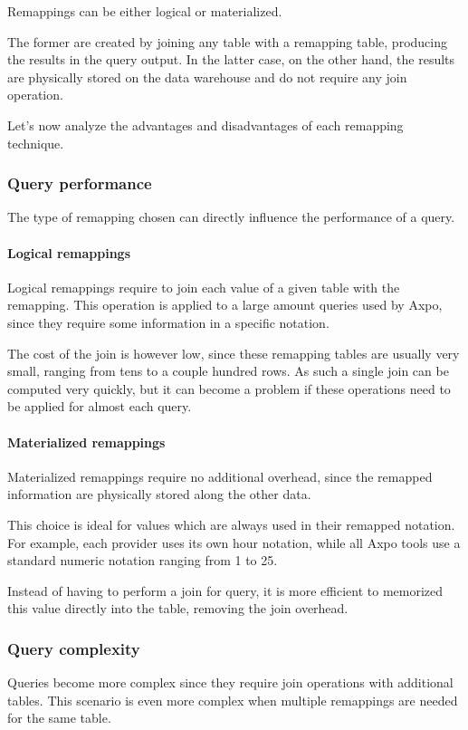 Remappings can be either logical or materialized.

The former are created by joining any table with a remapping table, producing the results in the query output.
In the latter case, on the other hand, the results are physically stored on the data warehouse and do not require any join operation.

Let's now analyze the advantages and disadvantages of each remapping technique.

\subsubsection{Query performance}
    The type of remapping chosen can directly influence the performance of a query.

    \paragraph{Logical remappings}
        Logical remappings require to join each value of a given table with the remapping.
        This operation is applied to a large amount queries used by Axpo, since they require some information in a specific notation.
        
        The cost of the join is however low, since these remapping tables are usually very small, ranging from tens to a couple hundred rows.
        As such a single join can be computed very quickly, but it can become a problem if these operations need to be applied for almost each query.
        
    \paragraph{Materialized remappings}
        Materialized remappings require no additional overhead, since the remapped information are physically stored along the other data.
        
        This choice is ideal for values which are always used in their remapped notation.
        For example, each provider uses its own hour notation, while all Axpo tools use a standard numeric notation ranging from 1 to 25.
        
        Instead of having to perform a join for  query, it is more efficient to memorized this value directly into the table, removing the join overhead.
    
    
\subsubsection{Query complexity}
    Queries become more complex since they require join operations with additional tables.
    This scenario is even more complex when multiple remappings are needed for the same table.
    
